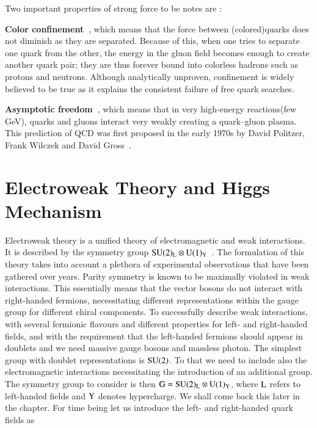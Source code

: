 Two important properties of strong force to be notes are :

{\bf Color confinement~\cite{APichQCD}}, which means that the force between (colored)quarks does not diminish as they are separated. Because of this, when one tries to separate one quark from the other, the energy in the gluon field becomes enough to create another quark pair; they are thus forever bound into colorless hadrons such as protons and neutrons. Although analytically unproven, confinement is widely believed to be true as it explains the consistent failure of free quark searches.

{\bf Asymptotic freedom~\cite{APichQCD}}, which means that in very high-energy reactions(few GeV), quarks and gluons interact very weakly creating a quark–gluon plasma. This prediction of QCD was first proposed in the early 1970s by David Politzer, Frank Wilczek and David Gross~\cite{AsympQCD1, AsympQCD2}. 





\section{Electroweak Theory and Higgs Mechanism}

Electroweak theory is a unified theory of electromagnetic and weak interactions. It is described by the symmetry group $\rm SU(2)_{L} \otimes U(1)_{Y}$~\cite{APichSM}. The formulation of this theory takes into account a plethora of experimental observations that have been gathered over years. Parity symmetry is known to be maximally violated in weak interactions. This essentially means that the vector bosons do not interact with right-handed fermions, necessitating different representations within the gauge group for different chiral components.  To successfully describe  weak interactions, with several fermionic  flavours and different properties for left- and right-handed fields, and with the requirement that the left-handed fermions should appear in doublets and  we need massive gauge  bosons and massless photon. The simplest group with doublet representations is $\rm SU(2)$. To that we need to include also the electromagnetic interactions necessitating the introduction of an additional group. The symmetry group to consider is then $\rm G = SU(2)_{L}\otimes U(1)_{Y}$, where $\rm L$ refers to left-handed fields and $\rm Y$ denotes hypercharge. We shall come back this later in the chapter. For time being let us introduce the left- and right-handed quark fields as

